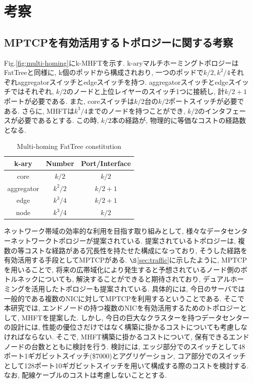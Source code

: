 \chapter{考察}
\label{chapter:consideration}

\section{MPTCPを有効活用するトポロジーに関する考察}

Fig.\ref{fig:multi-homing}にk-MHFTを示す. 
k-aryマルチホーミングトポロジーはFatTreeと同様に, k個のポッドから構成されおり, 
一つのポッドで$k/2, k^2/4$それぞれaggregatorスイッチとedgeスイッチを持つ. 
aggregatorスイッチとedgeスイッチではそれぞれ,
$k/2$のノードと上位レイヤーのスイッチ1つに接続し, 計$k/2+1$ポートが必要である. 
また, coreスイッチは$k/2$台の$k/2$ポートスイッチが必要である. 
さらに, MHFTは$k^3/4$までのノードを持つことができ, $k/2$のインタフェースが必要であるとする. 
この時, $k/2$本の経路が, 物理的に等価なコストの経路数となる. 


\begin{table}[t]
    \begin{center}
    \begin{tabular}{c|c|c}
    k-ary & Number & Port/Interface \\ \hline
    core & $k/2$ & $k/2$ \\ \hline
    aggregator & $k^2/2$ & $k / 2 + 1$ \\ \hline
    edge & $k^3 / 4$ & $k / 2 + 1$ \\ \hline
    node & $k^3 / 4$ & $k / 2$ \\
    \hline
    \end{tabular}
    \caption{Multi-homing FatTree constitution}
    \label{table:mhft_constitution}
    \end{center}
\end{table}


ネットワーク帯域の効率的な利用を目指す取り組みとして, 様々なデータセンターネットワークトポロジーが提案されている. 
提案されているトポロジーは, 複数の等コストな経路がある冗長性を持たせた構成になっており, そうした経路を有効活用する手段としてMPTCPがある. 
$\S$\ref{sec:traffic}に示したように, MPTCPを用いることで,
将来の広帯域化により発生すると予想されているノード側のボトルネックについても, 解決することができると期待されており,
デュアルホーミングを活用したトポロジーも提案されている\cite{improving}. 
具体的には, 今日のサーバでは一般的である複数のNICに対してMPTCPを利用するということである. 
そこで本研究では, エンドノードの持つ複数のNICを有効活用するためのトポロジーとして, MHFTを提案した. 
しかし, 今日の巨大なクラスターを持つデータセンターの設計には, 性能の優位さだけではなく構築に掛かるコストについても考慮しなければならない. 
そこで, MHFT構築に掛かるコストについて, 保有できるエンドノードの台数とともに検討を行う. 
検討には, エッジ部分でのスイッチとして48ポート1ギガビットスイッチ(\$7000)とアグリゲーション,
コア部分でのスイッチとして128ポート10ギガビットスイッチを用いて構成する際のコストを検討する\cite{fattree}.
なお, 配線ケーブルのコストは考慮しないこととする. 

